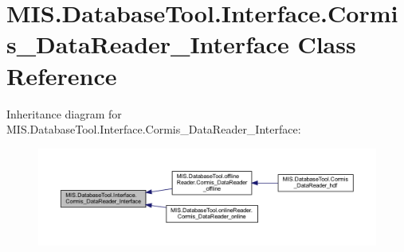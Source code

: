 \hypertarget{classMIS_1_1DatabaseTool_1_1Interface_1_1Cormis__DataReader__Interface}{}\section{M\+I\+S.\+Database\+Tool.\+Interface.\+Cormis\+\_\+\+Data\+Reader\+\_\+\+Interface Class Reference}
\label{classMIS_1_1DatabaseTool_1_1Interface_1_1Cormis__DataReader__Interface}


Inheritance diagram for M\+I\+S.\+Database\+Tool.\+Interface.\+Cormis\+\_\+\+Data\+Reader\+\_\+\+Interface\+:\nopagebreak
\begin{figure}[H]
\begin{center}
\leavevmode
\includegraphics[width=350pt]{classMIS_1_1DatabaseTool_1_1Interface_1_1Cormis__DataReader__Interface__inherit__graph}
\end{center}
\end{figure}
